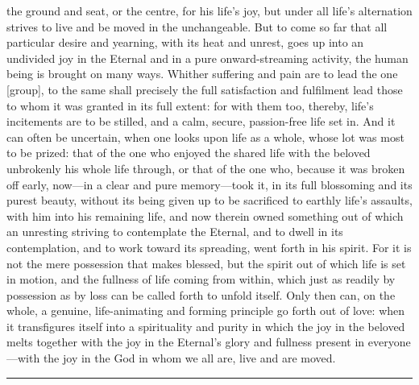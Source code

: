 \documentclass[12pt,a4paper]{book}
\begin{document}
the ground and seat, or the centre, for his life's joy, but under all life's
alternation strives to live and be moved in the unchangeable. But to come so
far that all particular desire and yearning, with its heat and unrest, goes
up into an undivided joy in the Eternal and in a pure onward-streaming
activity, the human being is brought on many ways. Whither suffering and
pain are to lead the one [group], to the same shall precisely the full
satisfaction and fulfilment lead those to whom it was granted in its full
extent: for with them too, thereby, life's incitements are to be stilled,
and a calm, secure, passion-free life set in. And it can often be uncertain,
when one looks upon life as a whole, whose lot was most to be prized: that
of the one who enjoyed the shared life with the beloved unbrokenly his whole
life through, or that of the one who, because it was broken off early,
now---in a clear and pure memory---took it, in its full blossoming and its
purest beauty, without its being given up to be sacrificed to earthly life's
assaults, with him into his remaining life, and now therein owned something
out of which an unresting striving to contemplate the Eternal, and to dwell
in its contemplation, and to work toward its spreading, went forth in his
spirit. For it is not the mere possession that makes blessed, but the spirit
out of which life is set in motion, and the fullness of life coming from
within, which just as readily by possession as by loss can be called forth
to unfold itself. Only then can, on the whole, a genuine, life-animating and
forming principle go forth out of love: when it transfigures itself into a
spirituality and purity in which the joy in the beloved melts together with
the joy in the Eternal's glory and fullness present in everyone---with the
joy in the God in whom we all are, live and are moved.

\begin{center}\rule{0.28\linewidth}{0.4pt}\end{center}
\end{document}
